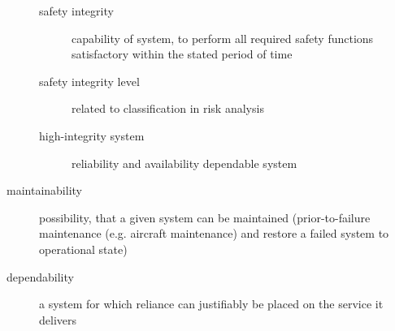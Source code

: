 \documentclass[a4paper, 10pt]{article}
\begin{document}
\begin{description}
\begin{description}
        \item[safety integrity] capability of system, to perform all required safety functions satisfactory within the stated period of time
        \item[safety integrity level] related to classification in risk analysis
        \item[high-integrity system] reliability and availability \follows dependable system
    \end{description}
    \item[maintainability] possibility, that a given system can be maintained (prior-to-failure maintenance (e.g. aircraft maintenance) and restore a failed system to operational state)
    \item[dependability] a system for which reliance can justifiably be placed on the service it delivers
\end{description}
\end{document}
